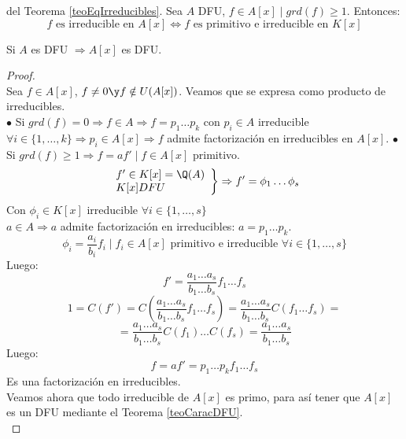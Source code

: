 \begin{coro}
    del Teorema \ref{teoEqIrreducibles}.\newline
    Sea $A$ DFU, $f \in A[x] \mid grd(f) \geq 1$. Entonces:
    $$f \mbox{ es irreducible en } A[x] \Leftrightarrow f \mbox{ es primitivo e irreducible en } K[x]$$
\end{coro}

\begin{teo}[de Gauss]
    \label{teoGauss}
    Si $A$ es DFU $\Rightarrow A[x]$ es DFU.
\begin{proof}
    \ \\
    Sea $f \in A[x]$, $f \neq 0 \y f \notin U(A[x])$. Veamos que se expresa como producto de irreducibles.\\

    
    $\bullet$ Si $grd(f)=0 \Rightarrow f \in A \Rightarrow f=p_1\ldots p_k$ con $p_i \in A$ irreducible\newline
    $\forall i \in \{1, \ldots, k\} \Rightarrow p_i \in A[x] \Rightarrow f$ admite factorización en irreducibles en $A[x]$.\newline
    $\bullet$ Si $grd(f)\ge 1 \Rightarrow f=af' \mid f \in A[x]$ primitivo.
    $$\left. \begin{array}{l}
            f' \in K[x]=\Q(A) \\
            K[x] DFU
        \end{array} \right\} \Rightarrow f' = \phi_1 \ldots \phi_s$$
    Con $\phi_i \in K[x]$ irreducible $\forall i \in \{1, \ldots, s\}$\\

    
    $a \in A \Rightarrow a$ admite factorización en irreducibles: $a = p_1 \ldots p_k$.
    $$\phi_i = \dfrac{a_i}{b_i}f_i \mid f_i \in A[x] \mbox{ primitivo e irreducible } \forall i \in \{1, \ldots, s\}$$
    Luego:
    $$f' = \dfrac{a_1\ldots a_s}{b_1\ldots b_s}f_1\ldots f_s$$
    $$1= C(f') = C\left(\dfrac{a_1\ldots a_s}{b_1\ldots b_s}f_1\ldots f_s\right) = \dfrac{a_1\ldots a_s}{b_1\ldots b_s}C(f_1\ldots f_s)=$$
    $$= \dfrac{a_1\ldots a_s}{b_1\ldots b_s} C(f_1)\ldots C(f_s) = \dfrac{a_1\ldots a_s}{b_1\ldots b_s}$$
    Luego:
    $$f=af' = p_1\ldots p_k f_1\ldots f_s$$
    Es una factorización en irreducibles.\\

    
    Veamos ahora que todo irreducible de $A[x]$ es primo, para así tener que $A[x]$ es un DFU mediante el Teorema \ref{teoCaracDFU}.\\


\end{proof}
\end{teo}

